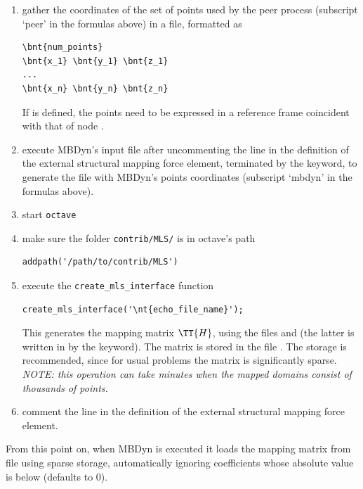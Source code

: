 \begin{enumerate}
\item gather the coordinates of the set of points used by the peer process
(subscript `peer' in the formulas above) in a file, formatted as
\begin{Verbatim}[commandchars=\\\{\}]
\bnt{num_points}
\bnt{x_1} \bnt{y_1} \bnt{z_1}
...
\bnt{x_n} \bnt{y_n} \bnt{z_n}
\end{Verbatim}
If  is defined, the points need to be expressed
in a reference frame coincident with that of node .

\item execute MBDyn's input file after uncommenting the  line
in the definition of the external structural mapping force element,
terminated by the  keyword, to generate the 
file with MBDyn's points coordinates (subscript `mbdyn' in the formulas above).

\item start \texttt{octave}

\item make sure the folder \texttt{contrib/MLS/} is in octave's path
\begin{Verbatim}[commandchars=\\\{\}]
    addpath('/path/to/contrib/MLS')
\end{Verbatim}

\item execute the \texttt{create\_mls\_interface} function
\begin{Verbatim}[commandchars=\\\{\}]
    create_mls_interface('\nt{echo_file_name}');
\end{Verbatim}
This generates the mapping matrix $\TT{H}$, using the files 
and  (the latter is written in 
by the  keyword). The matrix is stored in the file .
The  storage is recommended, since for usual problems
the matrix is significantly sparse.
\\
\emph{NOTE: this operation can take minutes when the mapped domains consist
of thousands of points.}

\item comment the  line
in the definition of the external structural mapping force element.
\end{enumerate}
From this point on, when MBDyn is executed it loads the mapping matrix
from file  using sparse storage, automatically
ignoring coefficients whose absolute value is below 
(defaults to 0).

